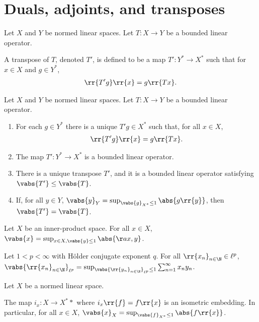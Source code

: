 \documentclass{article}
\begin{document}
\section{Duals, adjoints, and transposes}

\begin{definition}
  Let $X$ and $Y$ be normed linear spaces. Let $T:X\to Y$ be a bounded linear operator.

  A transpose of $T$, denoted $T'$, is defined to be a map $T':Y^*\to X^*$ such that
  for $x\in X$ and $g\in Y^*$,
  \begin{align*}
    \rr{T'g}\rr{x}=g\rr{Tx}.
  \end{align*}
\end{definition}

\begin{lemma}
  Let $X$ and $Y$ be normed  linear spaces. Let $T:X\to Y$ be a bounded linear operator.
  \begin{enumerate}
    \item For each $g\in Y^*$ there is a unique $T'g\in X^*$ such that, for all $x\in X$,
      \begin{align*}
        \rr{T'g}\rr{x}=g\rr{Tx}.
      \end{align*}
    \item The map $T':Y^*\to X^*$ is a bounded linear operator.
    \item There is a unique transpose $T'$, and it is a bounded linear operator satisfying
      $\vabs{T'}\leq \vabs{T}$.
    \item If, for all $y\in Y$, $\vabs{y}_Y=\sup_{\vabs{g}_{X^*}\leq 1}\abs{g\rr{y}}$, then $\vabs{T'}=\vabs{T}$.
  \end{enumerate}
\end{lemma}

\begin{lemma}
  Let $X$ be an inner-product space. For all $x\in X$, $\vabs{x}=\sup_{x\in X,\vabs{y}\leq 1} \abs{\aa{x,y}}$.
\end{lemma}

\begin{lemma}
  Let $1<p<\infty$ with H\"older conjugate exponent $q$. For all $\rr{x_n}_{n\in\N}\in\ell^p$,
  $\vabs{\rr{x_n}_{n\in\N}}_{\ell^p}=\sup_{\vabs{\rr{y_n}_{n\in\N}}_{\ell^p}\leq 1}\sum_{n=1}^{\infty} x_n y_n$.
\end{lemma}

\begin{theorem}
  Let $X$ be a normed linear space.

  The map $i_x:X\to X^**$ where $i_x\rr{f}=f\rr{x}$ is an isometric embedding. In particular,
  for all $x\in X$, $\vabs{x}_{X}=\sup_{\vabs{f}_{X^*}\leq 1}\abs{f\rr{x}}$.
\end{theorem}
\end{document}
